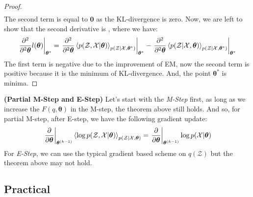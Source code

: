 \begin{proof}
\begin{equation*}
\begin{aligned}
    \end{aligned}
    \end{equation*}
    The second term is equal to $\boldsymbol 0$ as the KL-divergence is zero. Now, we are left to show that the second derivative is , where we have:
    \begin{equation*}
        \left.\frac{\partial^2}{\partial^2 \boldsymbol \theta} l(\boldsymbol \theta)\right|_{\boldsymbol \theta^*} = \left.\frac{\partial^2}{\partial^2 \boldsymbol \theta} \left\langle  p(\mathcal{Z}, \mathcal{X} | \boldsymbol \theta) \right\rangle_{p(\mathcal{Z} | \mathcal{X}, \boldsymbol \theta^*)}\right|_{\boldsymbol \theta^*} - \left.\frac{\partial^2}{\partial^2 \boldsymbol \theta} \left\langle  p(\mathcal{Z} | \mathcal{X}, \boldsymbol \theta)  \right\rangle_{ p(\mathcal{Z} | \mathcal{X}, \boldsymbol \theta^*) }\right|_{\boldsymbol \theta^*}
    \end{equation*}
    The first term is negative due to the improvement of EM, now the second term is positive because it is the minimum of KL-divergence. And, the point $\boldsymbol \theta^*$ is minima.
\end{proof}

\begin{definition}{\textbf{(Partial M-Step and E-Step)}}
    Let's start with the \emph{M-Step} first, as long as we increase the $F(q, \boldsymbol \theta)$ in the M-step, the theorem above still holds. And so, for partial M-step, after E-step, we have the following gradient update:
    \begin{equation*}
        \left.\frac{\partial}{\partial \boldsymbol \theta}\right|_{\boldsymbol \theta^{(k-1)}} \left\langle \log p(\mathcal{Z}, \mathcal{X} | \boldsymbol \theta) \right\rangle_{p(\mathcal{Z} | \mathcal{X}, \boldsymbol \theta)} = \left.\frac{\partial}{\partial \boldsymbol \theta}\right|_{\boldsymbol \theta^{(k-1)}}  \log p(\mathcal{X}|\boldsymbol \theta)
    \end{equation*}
    For \emph{E-Step}, we can use the typical gradient based scheme on $q(\mathcal{Z})$ but the theorem above may not hold.
\end{definition}

\subsection{Practical}

